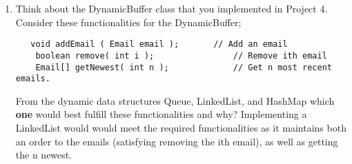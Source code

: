 \documentclass[addpoints]{exam}
\begin{document}
\begin{enumerate}
\item {}
Think about the DynamicBuffer class that you implemented in Project 4. Consider these functionalities for the DynamicBuffer;
\begin{lstlisting}
   void addEmail ( Email email ); 		// Add an email 
	boolean remove( int i ); 			    // Remove ith email
	Email[] getNewest( int n ); 		    // Get n most recent emails.    
\end{lstlisting}
From the dynamic data structures Queue, LinkedList, and HashMap which \textbf{one} would best fulfill these functionalities and why?
\newline
\newline
\Ans Implementing a LinkedList would would meet the required functionalities as it maintains both an order to the emails (satisfying removing the ith email), as well as getting the n newest.
\newline

\vspace{2em}
\end{enumerate}
\end{document}
